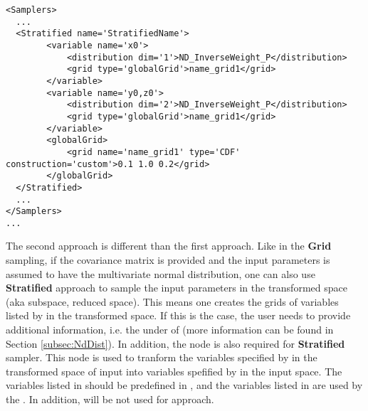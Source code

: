 \begin{lstlisting}[style=XML,morekeywords={ND,grid}]
<Samplers>
  ...
  <Stratified name='StratifiedName'>
        <variable name='x0'>
            <distribution dim='1'>ND_InverseWeight_P</distribution>
            <grid type='globalGrid'>name_grid1</grid>
        </variable>
        <variable name='y0,z0'>
            <distribution dim='2'>ND_InverseWeight_P</distribution>
            <grid type='globalGrid'>name_grid1</grid>
        </variable>
        <globalGrid>
            <grid name='name_grid1' type='CDF' construction='custom'>0.1 1.0 0.2</grid>
        </globalGrid>
  </Stratified>
  ...
</Samplers>
...
\end{lstlisting}

The second approach is different than the first approach. Like in the \textbf{Grid} sampling, if the covariance matrix is provided 
and the input parameters is assumed to have the multivariate normal distribution, one can also use \textbf{Stratified} approach to 
sample the input parameters in the transformed space (aka subspace, reduced space). This means one creates
the grids of variables listed by  in the transformed space. If this is the case, the user needs to 
provide additional information, i.e. the  under  of  
(more information can be found in Section \ref{subsec:NdDist}). In addition, the node  is also 
required for \textbf{Stratified} sampler. This node is used to tranform the variables specified by  in the 
transformed space of input into variables spefified by  in the input space. The variables listed 
in  should be predefined in , and the variables listed in  
are used by the . In addition,  will be not used for approach.



